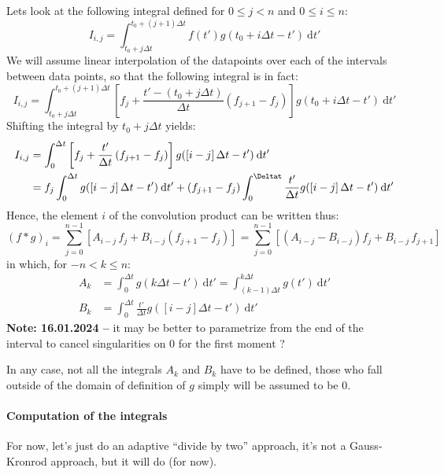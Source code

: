 \documentclass{article}
\newcommand{\dd}{\mathrm{d}}
\newcommand{\pa}[1]{\left(#1\right)}
\newcommand{\pab}[1]{\left[#1\right]}
\newcommand{\obs}[2]{\textbf{Note: #1 --} #2}
\begin{document}
Lets look at the following integral defined for $0\leq j < n$ and $0
\leq i \leq n$:
%
\begin{equation}
  I_{i,j} = 
  \int_{t_0 + j \Delta t}^{t_0 + (j+1) \Delta t}
  f(t') g(t_0 + i\Delta t-t')\:\dd t'
\end{equation}
%
We will assume linear interpolation of the datapoints over each of the
intervals between data points, so that the following integral is in
fact:
%
\begin{equation}
  I_{i,j}  =
\int_{t_0 + j \Delta t}^{t_0 + (j+1) \Delta t}
\pab{f_j + \frac{t' - \pa{t_0 + j \Delta t}}{\Delta t} \pa{f_{j+1} - f_j}}
g(t_0 + i\Delta t-t')\:\dd t'
\end{equation}
%
Shifting the integral by $t_0 + j\Delta t$ yields:
%
\begin{align}
  I_{i,j}  &=
  \int_{0}^{ \Delta t}
  \pab{f_j + \frac{t'}{\Delta t} \pa{f_{j+1} - f_j}}
  g(\pab{i-j}\Delta t -t')\:\dd t'\\
  & = f_j \int_{0}^{\Delta t} g(\pab{i-j}\Delta t -t')\:\dd t'
  + \pa{f_{j+1} - f_j}
  \int_{0}^{\Deltat}
  \frac{t'}{\Delta t} g(\pab{i-j}\Delta t -t')\:\dd t'
\end{align}
%
Hence, the element $i$ of the convolution product can be written thus:
%
\begin{equation}
  (f*g)_i = \sum_{j = 0}^{n-1}
  \pab{
    A_{i-j}\, f_j + B_{i-j}\pa{f_{j+1} - f_j}
  }
  =
  \sum_{j = 0}^{n-1}
  \pab{
    \pa{A_{i-j}- B_{i-j}}f_j + B_{i-j}\,f_{j+1}
  }
\end{equation}
%
in which, for $-n < k \leq n$:
%
\begin{align}
  A_k &= \int_{0}^{\Delta t} g(k\Delta t -t')\:\dd t' =
  \int_{\pa{k-1} \Delta t}^{k \Delta t} g(t') \:\dd t'\\[4mm]
  B_k &= \int_{0}^{\Delta t}
  \frac{t'}{\Delta t} g(\pab{i-j}\Delta t -t')\:\dd t'
\end{align}
%
\obs{16.01.2024}{it may be better to parametrize from the end of
  the interval to cancel singularities on 0 for the first moment ?}

In any case, not all the integrals $A_k$ and $B_k$ have to be defined,
those who fall outside of the domain of definition of $g$ simply will
be assumed to be 0.

\paragraph{Computation of the integrals}
For now, let's just do an adaptive ``divide by two'' approach, it's
not a Gauss-Kronrod approach, but it will do (for now).
\end{document}
